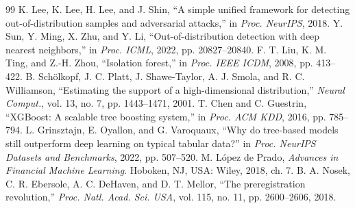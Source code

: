 \documentclass[conference]{IEEEtran}
\begin{document}
\begin{thebibliography}{99}
 K. Lee, K. Lee, H. Lee, and J. Shin, ``A simple unified framework for detecting out-of-distribution samples and adversarial attacks,'' in \emph{Proc. NeurIPS}, 2018.
 Y. Sun, Y. Ming, X. Zhu, and Y. Li, ``Out-of-distribution detection with deep nearest neighbors,'' in \emph{Proc. ICML}, 2022, pp. 20827--20840.
 F. T. Liu, K. M. Ting, and Z.-H. Zhou, ``Isolation forest,'' in \emph{Proc. IEEE ICDM}, 2008, pp. 413--422.
 B. Sch\"olkopf, J. C. Platt, J. Shawe-Taylor, A. J. Smola, and R. C. Williamson, ``Estimating the support of a high-dimensional distribution,'' \emph{Neural Comput.}, vol. 13, no. 7, pp. 1443--1471, 2001.
 T. Chen and C. Guestrin, ``XGBoost: A scalable tree boosting system,'' in \emph{Proc. ACM KDD}, 2016, pp. 785--794.
 L. Grinsztajn, E. Oyallon, and G. Varoquaux, ``Why do tree-based models still outperform deep learning on typical tabular data?'' in \emph{Proc. NeurIPS Datasets and Benchmarks}, 2022, pp. 507--520.
 M. L\'opez de Prado, \emph{Advances in Financial Machine Learning}. Hoboken, NJ, USA: Wiley, 2018, ch. 7.
 B. A. Nosek, C. R. Ebersole, A. C. DeHaven, and D. T. Mellor, ``The preregistration revolution,'' \emph{Proc. Natl. Acad. Sci. USA}, vol. 115, no. 11, pp. 2600--2606, 2018.
\end{thebibliography}
\end{document}
